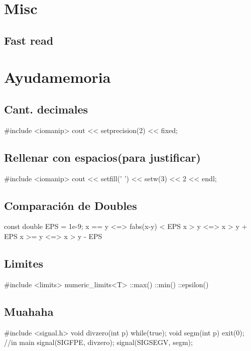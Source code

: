 {\section{Misc}

\subsection{Fast read}

\section{Ayudamemoria}%
\subsection*{Cant. decimales} 	
\begin{code}
#include <iomanip>
cout << setprecision(2) << fixed;
\end{code}
\subsection*{Rellenar con espacios(para justificar)}
\begin{code}
#include <iomanip>
cout << setfill(' ') << setw(3) << 2 << endl;
\end{code}
\subsection*{Comparación de Doubles}
\begin{code}
const double EPS = 1e-9;
x == y	<=> fabs(x-y) < EPS
x >  y	<=> x > y + EPS
x >= y	<=> x > y - EPS
\end{code}
\subsection*{Limites}
\begin{code}
#include <limits>
numeric_limits<T>
	::max()
	::min()
	::epsilon()
\end{code}
\subsection*{Muahaha}
\begin{code}
#include <signal.h>
void divzero(int p){
	while(true);}
void segm(int p){
	exit(0);}
//in main
signal(SIGFPE, divzero);
signal(SIGSEGV, segm);
\end{code}
}
